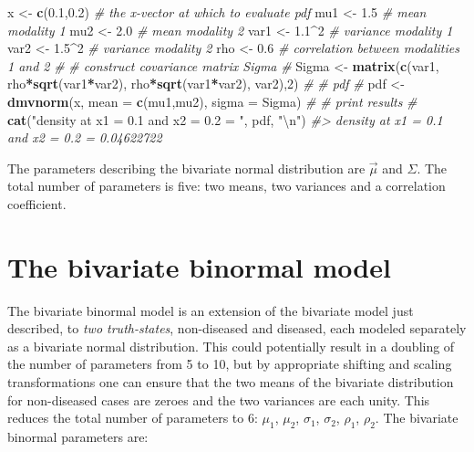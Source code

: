 \documentclass[
]{book}
\newenvironment{Shaded}{\begin{snugshade}}{\end{snugshade}}
\newcommand{\CharTok}[1]{\textcolor[rgb]{0.31,0.60,0.02}{#1}}
\newcommand{\CommentTok}[1]{\textcolor[rgb]{0.56,0.35,0.01}{\textit{#1}}}
\newcommand{\DataTypeTok}[1]{\textcolor[rgb]{0.13,0.29,0.53}{#1}}
\newcommand{\DecValTok}[1]{\textcolor[rgb]{0.00,0.00,0.81}{#1}}
\newcommand{\FloatTok}[1]{\textcolor[rgb]{0.00,0.00,0.81}{#1}}
\newcommand{\KeywordTok}[1]{\textcolor[rgb]{0.13,0.29,0.53}{\textbf{#1}}}
\newcommand{\NormalTok}[1]{#1}
\newcommand{\OperatorTok}[1]{\textcolor[rgb]{0.81,0.36,0.00}{\textbf{#1}}}
\newcommand{\StringTok}[1]{\textcolor[rgb]{0.31,0.60,0.02}{#1}}
\begin{document}
\begin{Shaded}
\begin{Highlighting}[]
\NormalTok{x <-}\StringTok{ }\KeywordTok{c}\NormalTok{(}\FloatTok{0.1}\NormalTok{,}\FloatTok{0.2}\NormalTok{) }\CommentTok{# the x-vector at which to evaluate pdf}
\NormalTok{mu1 <-}\StringTok{ }\FloatTok{1.5} \CommentTok{# mean modality 1}
\NormalTok{mu2 <-}\StringTok{ }\FloatTok{2.0} \CommentTok{# mean modality 2}
\NormalTok{var1 <-}\StringTok{ }\FloatTok{1.1}\OperatorTok{^}\DecValTok{2}  \CommentTok{# variance modality 1}
\NormalTok{var2 <-}\StringTok{ }\FloatTok{1.5}\OperatorTok{^}\DecValTok{2} \CommentTok{# variance modality 2}
\NormalTok{rho <-}\StringTok{ }\FloatTok{0.6} \CommentTok{# correlation between modalities 1 and 2}
\CommentTok{#}
\CommentTok{# construct covariance matrix Sigma}
\CommentTok{# }
\NormalTok{Sigma <-}\StringTok{ }\KeywordTok{matrix}\NormalTok{(}\KeywordTok{c}\NormalTok{(var1, rho}\OperatorTok{*}\KeywordTok{sqrt}\NormalTok{(var1}\OperatorTok{*}\NormalTok{var2), }
\NormalTok{                  rho}\OperatorTok{*}\KeywordTok{sqrt}\NormalTok{(var1}\OperatorTok{*}\NormalTok{var2), var2),}\DecValTok{2}\NormalTok{)}
\CommentTok{#}
\CommentTok{# pdf }
\CommentTok{# }
\NormalTok{pdf  <-}\StringTok{ }\KeywordTok{dmvnorm}\NormalTok{(x, }\DataTypeTok{mean =} \KeywordTok{c}\NormalTok{(mu1,mu2), }\DataTypeTok{sigma =}\NormalTok{ Sigma)}
\CommentTok{#}
\CommentTok{# print results}
\CommentTok{# }
\KeywordTok{cat}\NormalTok{(}\StringTok{"density at x1 = 0.1 and x2 = 0.2 = "}\NormalTok{, pdf, }\StringTok{"}\CharTok{\textbackslash{}n}\StringTok{"}\NormalTok{)}
\CommentTok{#> density at x1 = 0.1 and x2 = 0.2 =  0.04622722}
\end{Highlighting}
\end{Shaded}

The parameters describing the bivariate normal distribution are \(\overrightarrow{\mu}\) and \(\Sigma\). The total number of parameters is five: two means, two variances and a correlation coefficient.

\hypertarget{bivariate-binormal-model-formulae}{%
\section{The bivariate binormal model}\label{bivariate-binormal-model-formulae}}

The bivariate binormal model is an extension of the bivariate model just described, to \emph{two truth-states}, non-diseased and diseased, each modeled separately as a bivariate normal distribution. This could potentially result in a doubling of the number of parameters from 5 to 10, but by appropriate shifting and scaling transformations one can ensure that the two means of the bivariate distribution for non-diseased cases are zeroes and the two variances are each unity. This reduces the total number of parameters to 6: \(\mu_1\), \(\mu_2\), \(\sigma_1\), \(\sigma_2\), \(\rho_1\), \(\rho_2\). The bivariate binormal parameters are:
\end{document}

